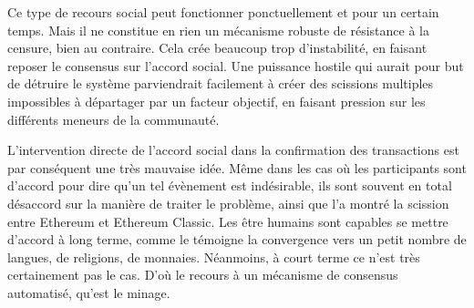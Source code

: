 %

Ce type de recours social peut fonctionner ponctuellement et pour un certain temps. Mais il ne constitue en rien un mécanisme robuste de résistance à la censure, bien au contraire. Cela crée beaucoup trop d'instabilité, en faisant reposer le consensus sur l'accord social. Une puissance hostile qui aurait pour but de détruire le système parviendrait facilement à créer des scissions multiples impossibles à départager par un facteur objectif, en faisant pression sur les différents meneurs de la communauté.

L'intervention directe de l'accord social dans la confirmation des transactions est par conséquent une très mauvaise idée. Même dans les cas où les participants sont d'accord pour dire qu'un tel évènement est indésirable, ils sont souvent en total désaccord sur la manière de traiter le problème, ainsi que l'a montré la scission entre Ethereum et Ethereum Classic. Les être humains sont capables se mettre d'accord à long terme, comme le témoigne la convergence vers un petit nombre de langues, de religions, de monnaies. Néanmoins, à court terme ce n'est très certainement pas le cas. D'où le recours à un mécanisme de consensus automatisé, qu'est le minage.

